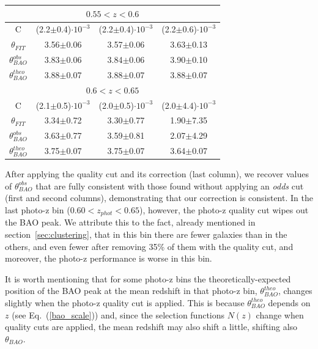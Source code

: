 \begin{table}
\begin{tabular}{ c  c  c  c }
\hline
\hline
\multicolumn{4}{c}{$0.55<z<0.6$} \\ 
\hline
\multicolumn{1}{c}{C}& (2.2$\pm$0.4)$\cdot 10^{-3}$& (2.2$\pm$0.4)$\cdot 10^{-3}$& (2.2$\pm$0.6)$\cdot 10^{-3}$\\
\multicolumn{1}{c}{$\theta_{FIT}$}& 3.56$\pm$0.06& 3.57$\pm$0.06& 3.63$\pm$0.13\\
\multicolumn{1}{c}{$\theta^{obs}_{BAO}$}& 3.83$\pm$0.06& 3.84$\pm$0.06& 3.90$\pm$0.10\\
\multicolumn{1}{c}{$\theta^{theo}_{BAO}$}& 3.88$\pm$0.07& 3.88$\pm$0.07& 3.88$\pm$0.07\\
\hline
\hline
\multicolumn{4}{c}{$0.6<z<0.65$} \\ 
\hline
\multicolumn{1}{c}{C}& (2.1$\pm$0.5)$\cdot 10^{-3}$& (2.0$\pm$0.5)$\cdot 10^{-3}$& (2.0$\pm$4.4)$\cdot 10^{-3}$\\
\multicolumn{1}{c}{$\theta_{FIT}$}& 3.34$\pm$0.72& 3.30$\pm$0.77& 1.90$\pm$7.35\\
\multicolumn{1}{c}{$\theta^{obs}_{BAO}$}& 3.63$\pm$0.77& 3.59$\pm$0.81& 2.07$\pm$4.29\\
\multicolumn{1}{c}{$\theta^{theo}_{BAO}$}& 3.75$\pm$0.07& 3.75$\pm$0.07& 3.64$\pm$0.07\\
\hline
\end{tabular}
\label{tab:BAO}
\end{table}

After applying the quality cut and its correction (last column), we recover values of $\theta^{obs}_{BAO}$ that are fully consistent with those found without applying an {\it odds} cut (first and second columns), demonstrating that our correction is consistent. In the last photo-z bin ($0.60 < z_{phot} < 0.65$), however,
the photo-z quality cut wipes out the BAO peak. We attribute this to the fact, already mentioned in section~\ref{sec:clustering}, that in this bin there are fewer galaxies than in the others, and even fewer after removing 35\% of them with the quality cut, and moreover, the photo-z performance is worse in this bin. 

It is worth mentioning that for some photo-z bins the theoretically-expected position of the BAO peak at the mean redshift in that photo-z bin, $\theta^{theo}_{BAO}$, changes slightly when the photo-z quality cut is applied. This is because $\theta^{theo}_{BAO}$ depends on $z$ (see Eq.~(\ref{bao_scale})) and, since the selection functions $N(z)$ change when quality cuts are applied, the mean redshift may also shift a little, shifting also $\theta_{BAO}$.  

